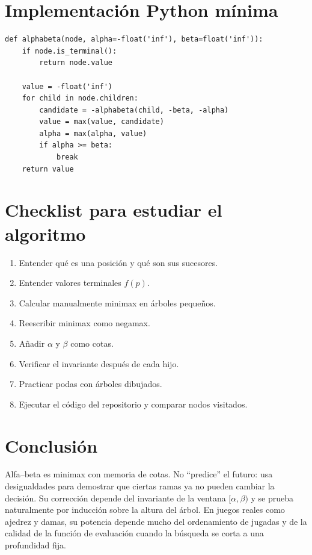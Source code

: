 \documentclass[11pt,a4paper]{article}
\theoremstyle{definition}
\begin{document}
\section{Implementación Python mínima}

\begin{lstlisting}[style=pythonSoft]
def alphabeta(node, alpha=-float('inf'), beta=float('inf')):
    if node.is_terminal():
        return node.value

    value = -float('inf')
    for child in node.children:
        candidate = -alphabeta(child, -beta, -alpha)
        value = max(value, candidate)
        alpha = max(alpha, value)
        if alpha >= beta:
            break
    return value
\end{lstlisting}

\section{Checklist para estudiar el algoritmo}

\begin{enumerate}
\item Entender qué es una posición y qué son sus sucesores.
\item Entender valores terminales $f(p)$.
\item Calcular manualmente minimax en árboles pequeños.
\item Reescribir minimax como negamax.
\item Añadir $\alpha$ y $\beta$ como cotas.
\item Verificar el invariante después de cada hijo.
\item Practicar podas con árboles dibujados.
\item Ejecutar el código del repositorio y comparar nodos visitados.
\end{enumerate}

\section{Conclusión}

Alfa--beta es minimax con memoria de cotas. No ``predice'' el futuro: usa desigualdades para demostrar que ciertas ramas ya no pueden cambiar la decisión. Su corrección depende del invariante de la ventana $[\alpha,\beta)$ y se prueba naturalmente por inducción sobre la altura del árbol. En juegos reales como ajedrez y damas, su potencia depende mucho del ordenamiento de jugadas y de la calidad de la función de evaluación cuando la búsqueda se corta a una profundidad fija.
\end{document}
